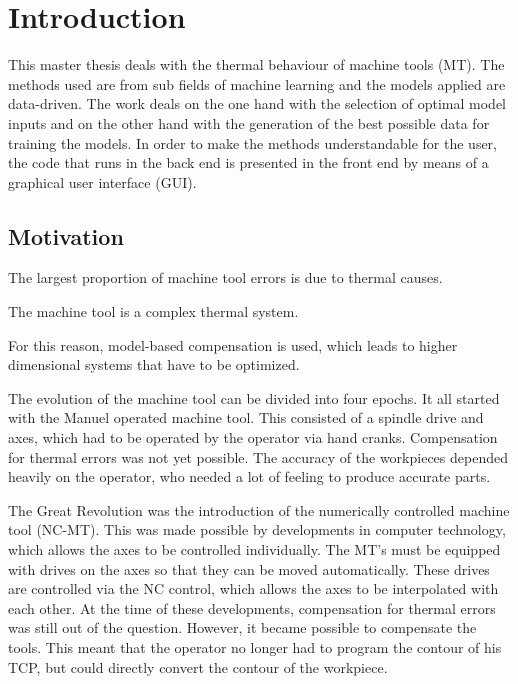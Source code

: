\setcounter{chapter}{0}

\chapter{Introduction}
\label{sec:introduction}

This master thesis deals with the thermal behaviour of machine tools (MT). The methods used are from sub fields of machine learning and the models applied are data-driven. The work deals on the one hand with the selection of optimal model inputs and on the other hand with the generation of the best possible data for training the models. In order to make the methods understandable for the user, the code that runs in the back end is presented in the front end by means of a graphical user interface (GUI). 

\section{Motivation}
\label{sec:motivation}

The largest proportion of machine tool errors is due to thermal causes.

The machine tool is a complex thermal system.

For this reason, model-based compensation is used, which leads to higher dimensional systems that have to be optimized.


The evolution of the machine tool can be divided into four epochs. It all started with the Manuel operated machine tool. This consisted of a spindle drive and axes, which had to be operated by the operator via hand cranks. Compensation for thermal errors was not yet possible. The accuracy of the workpieces depended heavily on the operator, who needed a lot of feeling to produce accurate parts. 

The Great Revolution was the introduction of the numerically controlled machine tool (NC-MT). This was made possible by developments in computer technology, which allows the axes to be controlled individually. The MT's must be equipped with drives on the axes so that they can be moved automatically. These drives are controlled via the NC control, which allows the axes to be interpolated with each other. At the time of these developments, compensation for thermal errors was still out of the question. However, it became possible to compensate the tools. This meant that the operator no longer had to program the contour of his TCP, but could directly convert the contour of the workpiece. 


